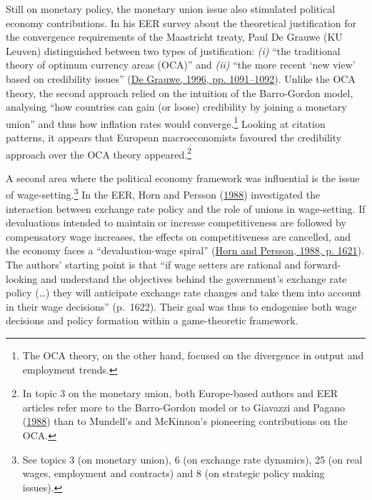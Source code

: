 \documentclass[
  12pt,
  onecolumn]{article}
\begin{document}
Still on monetary policy, the monetary union issue also stimulated
political economy contributions. In his EER survey about the theoretical
justification for the convergence requirements of the Maastricht treaty,
Paul De Grauwe (KU Leuven) distinguished between two types of
justification: \emph{(i)} ``the traditional theory of optimum currency
areas (OCA)'' and \emph{(ii)} ``the more recent `new view' based on
credibility issues'' (\protect\hyperlink{ref-degrauwe1996}{De Grauwe,
1996, pp. 1091--1092}). Unlike the OCA theory, the second approach
relied on the intuition of the Barro-Gordon model, analysing ``how
countries can gain (or loose) credibility by joining a monetary union''
and thus how inflation rates would converge.\footnote{The OCA theory, on
  the other hand, focused on the divergence in output and employment
  trends.} Looking at citation patterns, it appears that European
macroeconomists favoured the credibility approach over the OCA theory
appeared.\footnote{In topic 3 on the monetary union, both Europe-based
  authors and EER articles refer more to the Barro-Gordon model or to
  Giavazzi and Pagano (\protect\hyperlink{ref-giavazzi1988}{1988}) than
  to Mundell's and McKinnon's pioneering contributions on the OCA.}

A second area where the political economy framework was influential is
the issue of wage-setting.\footnote{See topics 3 (on monetary union), 6
  (on exchange rate dynamics), 25 (on real wages, employment and
  contracts) and 8 (on strategic policy making issues).} In the EER,
Horn and Persson (\protect\hyperlink{ref-horn1988}{1988}) investigated
the interaction between exchange rate policy and the role of unions in
wage-setting. If devaluations intended to maintain or increase
competitiveness are followed by compensatory wage increases, the effects
on competitiveness are cancelled, and the economy faces a
``devaluation-wage spiral'' (\protect\hyperlink{ref-horn1988}{Horn and
Persson, 1988, p. 1621}). The authors' starting point is that ``if wage
setters are rational and forward-looking and understand the objectives
behind the government's exchange rate policy (\ldots) they will
anticipate exchange rate changes and take them into account in their
wage decisions'' (p.~1622). Their goal was thus to endogenise both wage
decisions and policy formation within a game-theoretic framework.
\end{document}
